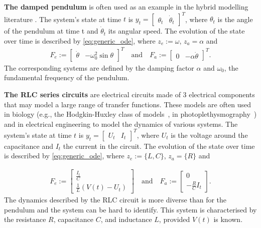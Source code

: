 \documentclass{article}
\begin{document}
\textbf{The damped pendulum} is often used as an example in the hybrid modelling literature \citep{APHYNITY, HVAE}. The system's state at time $t$ is $y_t = \begin{bmatrix}\theta_t & \dot \theta_t\end{bmatrix}^T$, where $\theta_t$ is the angle of the pendulum at time t and $\dot \theta_t$ its angular speed. The evolution of the state over time is described by \eqref{eq:generic_ode}, where $z_e:=\omega$, $z_a=\alpha$ and
\begin{align}
    F_e := \begin{bmatrix}\dot \theta &  -\omega_0^2 \sin \theta   \end{bmatrix}^T \quad \text{and} \quad F_a := \begin{bmatrix}0 &  -\alpha \dot \theta \end{bmatrix}^T.
\end{align}
The corresponding systems are defined by the damping factor $\alpha$ and $\omega_0$, the fundamental frequency of the pendulum.

\textbf{The RLC series circuits} are electrical circuits made of 3 electrical components that may model a large range of transfer functions. These models are often used in biology (e.g., the Hodgkin-Huxley class of models~\citep{hh-model}, in photoplethysmography~\citep{ppg-model}) and in electrical engineering to model the dynamics of various systems. The system's state at time $t$ is $y_t = \begin{bmatrix}U_t & I_t\end{bmatrix}^T$, where $U_t$ is the voltage around the capacitance and $I_t$ the current in the circuit. The evolution of the state over time is described by \eqref{eq:generic_ode}, where $z_e:=\{L, C\}$, $z_a= \{R\}$ and

\begin{align}
    F_e := \begin{bmatrix}\frac{I_t}{C} \\ \frac{1}{L} (V(t) - U_t) \end{bmatrix} \quad \text{and} \quad F_a := \begin{bmatrix}0 \\- \frac{R}{C}I_t\end{bmatrix}.
\end{align} The dynamics described by the RLC circuit is more diverse than for the pendulum and the system can be hard to identify. This system is characterised by the resistance $R$, capacitance $C$, and inductance $L$, provided $V(t)$ is known.
\end{document}
